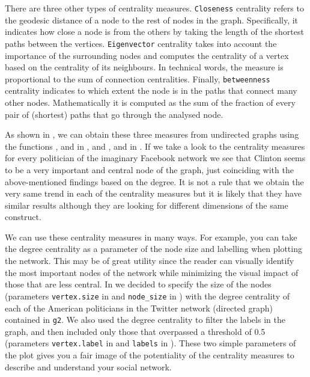 
There are three other types of centrality measures. \texttt{Closeness} centrality refers to the geodesic distance of a node to the rest of nodes in the graph. Specifically, it indicates how close a node is from the others by taking the length of the shortest paths between the vertices. \texttt{Eigenvector} centrality takes into account the importance of the surrounding nodes and computes the centrality of a vertex based on the centrality of its neighbours. In technical words, the measure is proportional to the sum of connection centralities. Finally, \texttt{betweenness} centrality indicates to which extent the node is in the paths that connect many other nodes. Mathematically it is computed as the sum of the fraction of every pair of (shortest) paths that go through the analysed node. 

As shown in , we can obtain these three measures from undirected graphs using the functions ,  and  in , and ,  and  in . If we take a look to the centrality measures for every politician of the imaginary Facebook network we see that Clinton seems to be a very important and central node of the graph, just coinciding with the above-mentioned findings based on the degree. It is not a rule that we obtain the very same trend in each of the centrality measures but it is likely that they have similar results although they are looking for different dimensions of the same construct.


We can use these centrality measures in many ways. For example, you can take the degree centrality as a parameter of the node size and labelling when plotting the network. This may be of great utility since the reader can visually identify the most important nodes of the network while minimizing the visual impact of those that are less central. In  we decided to specify the size of the nodes (parameters \verb|vertex.size| in  and \verb|node_size| in ) with the degree centrality of each of the American politicians in the Twitter network (directed graph) contained in \texttt{g2}. We also used the degree centrality to filter the labels in the graph, and then included only those that overpassed a threshold of 0.5 (parameters \verb|vertex.label| in  and \verb|labels| in ). These two simple parameters of the plot gives you a fair image of the potentiality of the centrality measures to describe and understand your social network.


